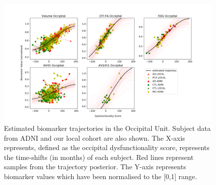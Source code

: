\documentclass{llncs}
\begin{document}
\begin{figure}[H]
\includegraphics[width=\textwidth, trim=90 0 110 0, clip]{figures/unit1_allTraj_tad-drcTinyPen1_JMD.png} 
\caption{Estimated biomarker trajectories in the Occipital Unit. Subject data from ADNI and our local cohort are also shown. The X-axis represents, defined as the occipital dysfunctionality score, represents the time-shifts (in months) of each subject. Red lines represent samples from the trajectory posterior. The Y-axis represents biomarker values which have been normalised to the [0,1] range.}
\label{fig:occipUnit}
\end{figure}
\end{document}
